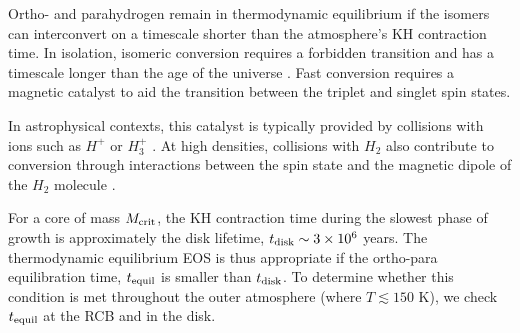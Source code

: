 Ortho- and parahydrogen remain in thermodynamic equilibrium if the isomers can interconvert on a timescale shorter than the atmosphere's KH contraction time.  In isolation, isomeric conversion requires a forbidden transition and has a timescale longer than the age of the universe \citep[e.g.,][]{pachucki08}.  Fast conversion requires a magnetic catalyst to aid the transition between the triplet and singlet spin states.

In astrophysical contexts, this catalyst is typically provided by collisions with ions such as $H^+$ or $H_3^+$ \citep[e.g.,][]{lique12,lique14}.  
At high densities, collisions with $H_2$ also contribute to conversion through interactions between the spin state and the magnetic dipole of the $H_2$ molecule \citep{huestis08}. 

For a core of mass $M_{\rm crit}$, the KH contraction time during the slowest phase of growth is approximately the disk lifetime, $t_{\rm disk} \sim 3\times 10^6$ years.  
The thermodynamic equilibrium EOS is thus appropriate if the ortho-para equilibration time, $t_{\rm equil}$ is smaller than $t_{\rm disk}$.
To determine whether this condition is met throughout the outer atmosphere (where $T \lesssim 150$ K), we check $t_{\rm equil}$ at the RCB and in the disk.

